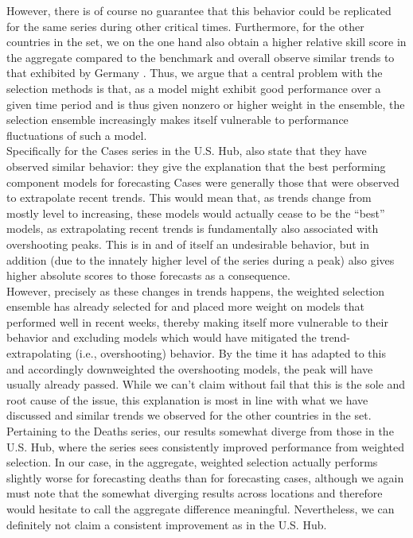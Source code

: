 However, there is of course no guarantee that this behavior could be replicated for the same series during other critical times. Furthermore, for the other countries in the set, we on the one hand also obtain a higher relative skill score in the aggregate compared to the benchmark and overall observe similar trends to that exhibited by Germany . Thus, we argue that a central problem with the selection methods is that, as a model might exhibit good performance over a given time period and is thus given nonzero or higher weight in the ensemble, the selection ensemble increasingly makes itself vulnerable to performance fluctuations of such a model.\\ 
Specifically for the Cases series in the U.S. Hub, \cite{ray_comparing_2022} also state that they have observed similar behavior: they give the explanation that the best performing component models for forecasting Cases were generally those that were observed to extrapolate recent trends. This would mean that, as trends change from mostly level to increasing, these models would actually cease to be the ``best'' models, as extrapolating recent trends is fundamentally also associated with overshooting peaks. This is in and of itself an undesirable behavior, but in addition (due to the innately higher level of the series during a peak) also gives higher absolute scores to those forecasts as a consequence.\\
However, precisely as these changes in trends happens, the weighted selection ensemble has already selected for and placed more weight on models that performed well in recent weeks, thereby making itself more vulnerable to their behavior and excluding models which would have mitigated the trend-extrapolating (i.e., overshooting) behavior. By the time it has adapted to this and accordingly downweighted the overshooting models, the peak will have usually already passed. While we can't claim without fail that this is the sole and root cause of the issue, this explanation is most in line with what we have discussed and similar trends we observed for the other countries in the set.\medskip\\
Pertaining to the Deaths series, our results somewhat diverge from those in the U.S. Hub, where the series sees consistently improved performance from weighted selection. In our case, in the aggregate, weighted selection actually performs slightly worse for forecasting deaths than for forecasting cases, although we again must note that the somewhat diverging results across locations and therefore would hesitate to call the aggregate difference meaningful. Nevertheless, we can definitely not claim a consistent improvement as in the U.S. Hub.\\
